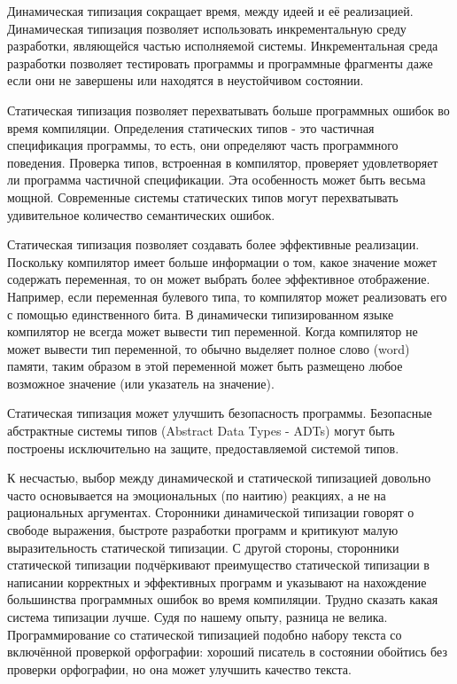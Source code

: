 Динамическая типизация сокращает время, между идеей и её реализацией. Динамическая типизация позволяет использовать инкрементальную среду разработки, являющейся частью исполняемой системы. Инкрементальная среда разработки позволяет тестировать программы и программные фрагменты даже если они не завершены или находятся в неустойчивом состоянии.

Статическая типизация позволяет перехватывать больше программных ошибок во время компиляции. Определения статических типов - это частичная спецификация программы, то есть, они определяют часть программного поведения. Проверка типов, встроенная в компилятор, проверяет удовлетворяет ли программа частичной спецификации. Эта особенность может быть весьма мощной. Современные системы статических типов могут перехватывать удивительное количество семантических ошибок.

Статическая типизация позволяет создавать более эффективные реализации. Поскольку компилятор имеет больше информации о том, какое значение может содержать переменная, то он может выбрать более эффективное отображение. Например, если переменная булевого типа, то компилятор может реализовать его с помощью единственного бита. В динамически типизированном языке компилятор не всегда может вывести тип переменной. Когда компилятор не может вывести тип переменной, то обычно выделяет полное слово (word) памяти, таким образом в этой переменной может быть размещено любое возможное значение (или указатель на значение).

Статическая типизация может улучшить безопасность программы. Безопасные абстрактные системы типов (Abstract Data Types - ADTs) могут быть построены исключительно на защите, предоставляемой системой типов.

К несчастью, выбор между динамической и статической типизацией довольно часто основывается на эмоциональных (по наитию) реакциях, а не на рациональных аргументах. Сторонники динамической типизации говорят о свободе выражения, быстроте разработки программ и критикуют малую выразительность статической типизации. С другой стороны, сторонники статической типизации подчёркивают преимущество статической типизации в написании корректных и эффективных программ и указывают на нахождение большинства программных ошибок во время компиляции. Трудно сказать какая система типизации лучше. Судя по нашему опыту, разница не велика. Программирование со статической типизацией подобно набору текста со включённой проверкой орфографии: хороший писатель в состоянии обойтись без проверки орфографии, но она может улучшить качество текста.

